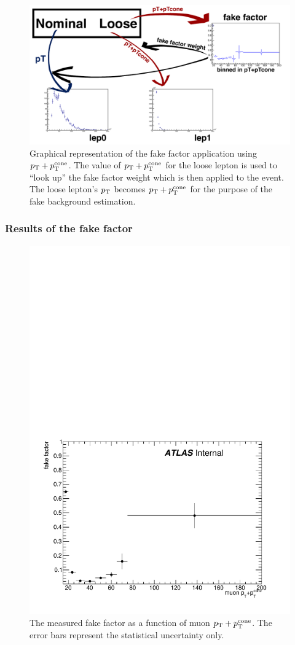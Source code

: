 \begin{figure}[htbp]
  \centering
  \includegraphics[width=.95\textwidth]{figs/ssww_13tev/backgrounds/ff/apply_ff}
  \caption{Graphical representation of the fake factor application using $p_{\mathrm{T}}+p_{\mathrm{T}}^{\textrm{cone}}$.  The value of $p_{\mathrm{T}}+p_{\mathrm{T}}^{\textrm{cone}}$ for the loose lepton is used to ``look up'' the fake factor weight which is then applied to the event.  The loose lepton's $p_{\mathrm{T}}$ becomes $p_{\mathrm{T}}+p_{\mathrm{T}}^{\textrm{cone}}$ for the purpose of the fake background estimation.}
  \label{fig:ssww13tev_ff_application}
\end{figure}

%
\subsubsection{Results of the fake factor}\label{ssww13tev:ff_results}

\begin{figure}[htbp]
  \centering
  \includegraphics[width=.6\textwidth]{figs/ssww_13tev/backgrounds/ff/muon_ff}
  \caption{The measured fake factor as a function of muon $p_{\mathrm{T}}+p_{\mathrm{T}}^{\textrm{cone}}$.  The error bars represent the statistical uncertainty only.}
  \label{fig:ssww13tev_ff_muon}
\end{figure}

